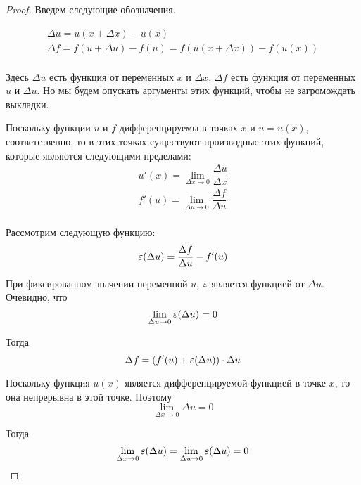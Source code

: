 \documentclass[a4paper]{article}
\theoremstyle{named}
\begin{document}
\begin{colloq}
		\begin{proof}
			Введем следующие обозначения.

			\[\begin{gathered}
				\Delta u = u(x + \Delta x) - u(x) \\
				\Delta f = f(u + \Delta u) - f(u) = f(u(x + \Delta x)) - f(u(x)) \\
			\end{gathered}\]

			Здесь $\Delta u$ есть функция от переменных $x$ и $\Delta x$, $\Delta f$ есть функция от переменных $u$ и $\Delta u$. Но мы будем опускать аргументы этих функций, чтобы не загромождать выкладки.

			Поскольку функции $u$ и $f$ дифференцируемы в точках $x$ и $u = u(x)$, соответственно, то в этих точках существуют производные этих функций, которые являются следующими пределами:
			\[\begin{gathered}
				u'(x) = \lim_{\Delta x \to 0} \dfrac{\Delta u}{\Delta x} \\
				f'(u) = \lim_{\Delta u \to 0} \dfrac{\Delta f}{\Delta u} \\
			\end{gathered}\]

			Рассмотрим следующую функцию:
			\begin{equation*}
				\varepsilon(\Delta u) = \dfrac{\Delta f}{\Delta u} - f'(u)
			\end{equation*}

			При фиксированном значении переменной $u$, $\varepsilon$ является функцией от $\Delta u$. Очевидно, что
			\begin{equation*}
				\lim_{\Delta u \to 0} \varepsilon(\Delta u) = 0
			\end{equation*}

			Тогда
			\begin{equation*}
				\Delta f = (f'(u) + \varepsilon(\Delta u)) \cdot \Delta u
			\end{equation*}

			Поскольку функция $u(x)$ является дифференцируемой функцией в точке $x$, то она непрерывна в этой точке. Поэтому
			\begin{equation*}
				\lim_{\Delta x \to 0} \Delta u = 0
			\end{equation*}

			Тогда
			\begin{equation*}
				\lim_{\Delta x \to 0} \varepsilon(\Delta u) = \lim_{\Delta u \to 0} \varepsilon(\Delta u) = 0
			\end{equation*}


\end{proof}
\end{colloq}
\end{document}
